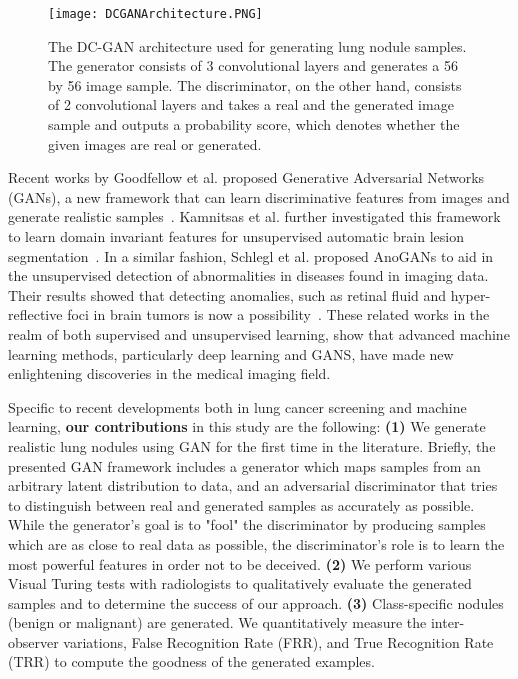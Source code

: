 \documentclass{article}
\begin{document}
\begin{figure*}[t]
\centering
    \texttt{[image: DCGANArchitecture.PNG]}
	\caption{The DC-GAN architecture used for generating lung nodule samples. The generator consists of 3 convolutional layers and generates a 56 by 56 image sample. The discriminator, on the other hand, consists of 2 convolutional layers and takes a real and the generated image sample and outputs a probability score, which denotes whether the given images are real or generated.}
    \label{fig:DC-GAN}
\end{figure*}  

Recent works by Goodfellow et al. proposed Generative Adversarial Networks (GANs), a new framework that can learn discriminative features from images and generate realistic samples~\cite{IanGans}. Kamnitsas et al. further investigated this framework to learn domain invariant features for unsupervised automatic brain lesion segmentation~\cite{KonstaBrainLesions}. In a similar fashion, Schlegl et al. proposed AnoGANs to aid in the unsupervised detection of abnormalities in diseases found in imaging data. Their results showed that detecting anomalies, such as retinal fluid and hyper-reflective foci in brain tumors is now a possibility~\cite{SchleglUnsupervisedAnomaly}. These related works in the realm of both supervised and unsupervised learning, show that advanced machine learning methods, particularly deep learning and GANS, have made new enlightening discoveries in the medical imaging field. 

Specific to recent developments both in lung cancer screening and machine learning, \textbf{our contributions} in this study are the following: \textbf{(1)} We generate realistic lung nodules using GAN for the first time in the literature. Briefly, the presented GAN framework includes a generator which maps samples from an arbitrary latent distribution to data, and an adversarial discriminator that tries to distinguish between real and generated samples as accurately as possible. While the generator's goal is to "fool" the discriminator by producing samples which are as close to real data as possible, the discriminator's role is to learn the most powerful features in order not to be deceived.
\vspace{-1 px}
\textbf{(2)} We perform various Visual Turing tests with radiologists to qualitatively evaluate the generated samples and to determine the success of our approach.
\vspace{-1 px}
\textbf{(3)} Class-specific nodules (benign or malignant) are generated. We quantitatively measure the inter-observer variations, False Recognition Rate (FRR), and True Recognition Rate (TRR) to compute the goodness of the generated examples.
\vspace{-1 px}
\end{document}
